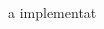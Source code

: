\documentclass[a4paper]{article}
\begin{document}
\begin{multicols*}{2}
\begin{footnotesize}
a implementat
\end{footnotesize}
\end{multicols*}
\end{document}
